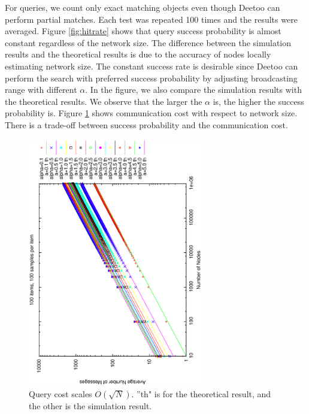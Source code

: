 \documentclass[conference]{IEEEtran}
\begin{document}
For queries, we count only exact matching objects even though Deetoo can perform partial matches.
Each test was repeated 100 times and the results were averaged. 
Figure \ref{fig:hitrate} shows that query success probability is almost constant 
regardless of the network size. The difference between the simulation results and 
the theoretical results is due to the accuracy of nodes locally estimating network
size.
The constant success rate is desirable since 
Deetoo can perform the search with preferred success probability by adjusting 
broadcasting range with different $\alpha$.  
In the figure, we also compare the simulation results with the theoretical results.
We observe that the larger the $\alpha$ is, the higher the success probability is.
%
Figure \ref{fig:cost} shows communication cost with respect to network size. There is 
a trade-off between success probability and the communication cost. 
\begin{figure}
\centering
\includegraphics[angle=270,width=3in]{th_hops_loglog}
\caption{Query cost scales $O(\sqrt N)$. ''th" is for the theoretical result, 
and the other is the simulation result.} \label{fig:cost}
\end{figure}
\end{document}
